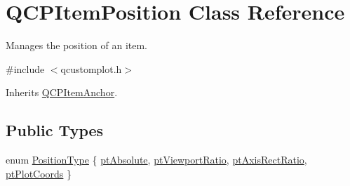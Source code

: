 \hypertarget{class_q_c_p_item_position}{\section{Q\-C\-P\-Item\-Position Class Reference}
\label{class_q_c_p_item_position}
}


Manages the position of an item.  




{\ttfamily \#include $<$qcustomplot.\-h$>$}



Inherits \hyperlink{class_q_c_p_item_anchor}{Q\-C\-P\-Item\-Anchor}.

\subsection*{Public Types}
\begin{DoxyCompactItemize}
\item 
enum \hyperlink{class_q_c_p_item_position_aad9936c22bf43e3d358552f6e86dbdc8}{Position\-Type} \{ \hyperlink{class_q_c_p_item_position_aad9936c22bf43e3d358552f6e86dbdc8a564f5e53e550ead1ec5fc7fc7d0b73e0}{pt\-Absolute}, 
\hyperlink{class_q_c_p_item_position_aad9936c22bf43e3d358552f6e86dbdc8ac7d6aa89ceacb39658b0d6da061c789a}{pt\-Viewport\-Ratio}, 
\hyperlink{class_q_c_p_item_position_aad9936c22bf43e3d358552f6e86dbdc8a01080fd00eaf09fa238ef6b73bbfef75}{pt\-Axis\-Rect\-Ratio}, 
\hyperlink{class_q_c_p_item_position_aad9936c22bf43e3d358552f6e86dbdc8ad5ffb8dc99ad73263f7010c77342294c}{pt\-Plot\-Coords}
 \}
\end{DoxyCompactItemize}
